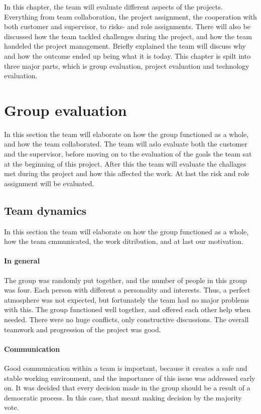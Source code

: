 In this chapter, the team will evaluate different aspects of the projects. 
Everything from team collaboration, the project assignment, the cooperation with both customer and supervisor, to risks- and role assignments. There will also be discussed how the team tackled challenges during the project, and how the team handeled the project management. Briefly explained the team will discuss why and how the outcome ended up being what it is today.
This chapter is spilt into three major parts, which is group evaluation, project evaluation and technology evaluation. 

\section{Group evaluation}
In this section the team will elaborate on how the group functioned as a whole, and how the team collaborated. The team will aslo evaluate both the customer and the supervisor, before moving on to the evaluation of the goals the team sat at the beginning of this project. After this the team will evaluate the challages met during ths project and how this affected the work. At last the risk and role assignment will be evaluated.

\subsection{Team dynamics}
In this section the team will elaborate on how the group functioned as a whole, how the team cmmunicated, the work ditribution, and at last our motivation.

\paragraph{In general}
The group was randomly put together, and the number of people in this group was four.
Each person with different a personality and interests. Thus, a perfect atmosphere was not expected, but fortunately the team had no major problems with this. 
The group functioned well together, and offered each other help when needed. There were no huge conflicts, only constructive discussions.
The overall teamwork and progression of the project was good.

\paragraph{Communication}
Good communication within a team is important, because it creates a safe and stable working environment, and the importance of this issue was addressed early on. 
It was decided that every decision made in the group should be a result of a democratic process. In this case, that meant making decision by the majority vote.

